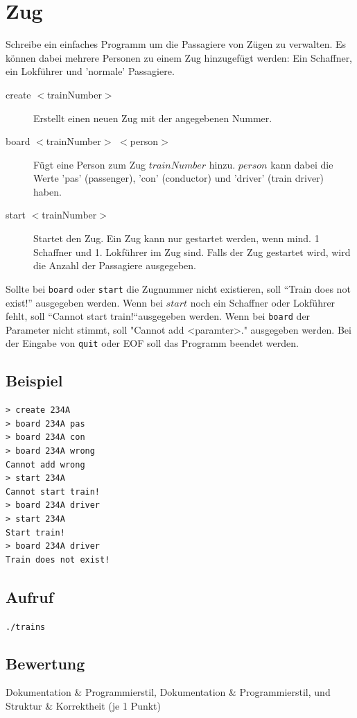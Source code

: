 \documentclass[a4paper,10pt]{article}
\begin{document}
\section*{Zug}

Schreibe ein einfaches Programm um die Passagiere von Zügen zu verwalten. Es können dabei mehrere Personen zu einem Zug hinzugefügt werden: Ein Schaffner, ein Lokführer und 'normale' Passagiere. 

\begin{description}
 \item[create $<$trainNumber$>$] Erstellt einen neuen Zug mit der angegebenen Nummer.
 \item[board $<$trainNumber$>$ $<$person$>$] Fügt eine Person zum Zug  $trainNumber$ hinzu. $person$ kann dabei die Werte 'pas' (passenger), 'con' (conductor)  und 'driver' (train driver) haben.
 \item[start $<$trainNumber$>$] Startet den Zug. Ein Zug kann nur gestartet werden, wenn mind. 1 Schaffner und 1. Lokführer im Zug sind. Falls der Zug gestartet wird, wird die Anzahl der Passagiere ausgegeben. 
\end{description}

Sollte bei \texttt{board} oder \texttt{start} die Zugnummer nicht existieren, soll ``Train does not exist!'' ausgegeben werden. Wenn bei $start$ noch ein Schaffner oder Lokführer fehlt, soll ``Cannot start train!``ausgegeben werden. Wenn bei \texttt{board} der Parameter nicht stimmt, soll "Cannot add <paramter>." ausgegeben werden.
Bei der Eingabe von \texttt{quit} oder EOF soll das Programm beendet werden.

\subsection*{Beispiel}
\begin{verbatim}
> create 234A
> board 234A pas
> board 234A con
> board 234A wrong
Cannot add wrong
> start 234A
Cannot start train!
> board 234A driver
> start 234A
Start train!
> board 234A driver
Train does not exist!
\end{verbatim}

\subsection*{Aufruf}
\texttt{./trains}

\subsection*{Bewertung}
Dokumentation \& Programmierstil,  Dokumentation \& Programmierstil, und Struktur \& Korrektheit (je 1 Punkt)
\newpage
\end{document}
